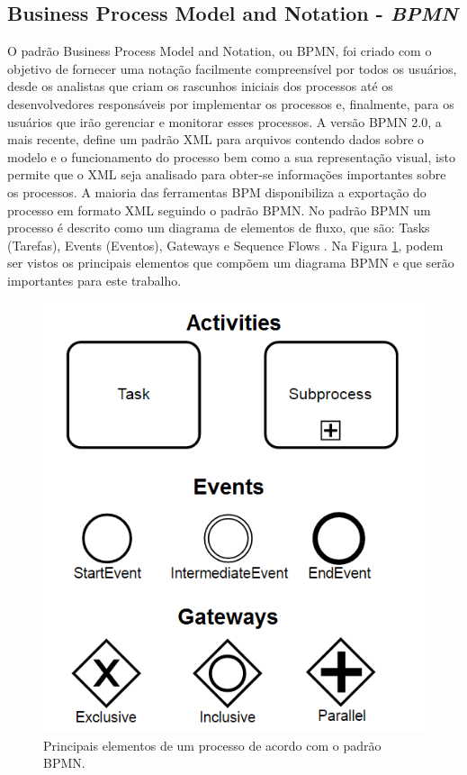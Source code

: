 \documentclass[12pt]{article}
\begin{document}
\subsection{Business Process Model and Notation - \emph{BPMN}}
O padrão Business Process Model and Notation, ou BPMN, foi criado com o objetivo de fornecer uma notação facilmente compreensível por todos os usuários, desde os analistas que criam os rascunhos iniciais dos processos até os desenvolvedores responsáveis por implementar os processos e, finalmente, para os usuários que irão gerenciar e monitorar esses processos\cite{model2011notation}. A versão BPMN 2.0, a mais recente, define um padrão XML para arquivos contendo dados sobre o modelo e o funcionamento do processo bem como a sua representação visual\cite{kurzdiagram}, isto permite que o XML seja analisado para obter-se informações importantes sobre os processos. A maioria das ferramentas BPM disponibiliza a exportação do processo em formato XML seguindo o padrão BPMN. No padrão BPMN um processo é descrito como um diagrama de elementos de fluxo, que são: Tasks (Tarefas), Events (Eventos), Gateways e Sequence Flows \cite{kurzdiagram}. Na Figura \ref{fig:bpmn}, podem ser vistos os principais elementos que compõem um diagrama BPMN e que serão importantes para este trabalho.

\begin{figure}[ht]
\centering
\includegraphics[width=.8\textwidth]{figuras/bpmn.png}
\caption{Principais elementos de um processo de acordo com o padrão BPMN.}
\label{fig:bpmn}
\end{figure}
\end{document}
